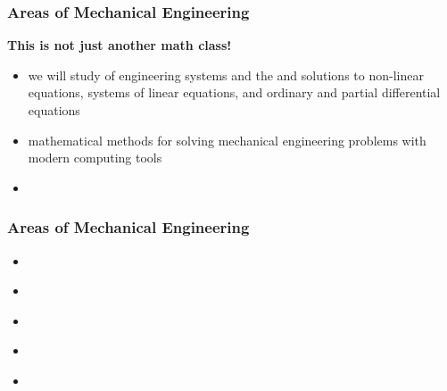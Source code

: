 \documentclass[fleqn]{beamer} %
\newcommand{\sectionIsubsectionIItitle}{Areas of Mechanical Engineering}
\begin{document}
			\begin{frame}
				\frametitle{\sectionIsubsectionIItitle}
				\bigskip

				\textbf{This is not just another math class!}\\

				\begin{itemize}
					\item we will study \underline{\hspace{40mm}} of engineering systems and the \underline{\hspace{30mm}} and \underline{\hspace{30mm}} solutions to non-linear equations, systems of linear equations, and ordinary and partial differential equations \\
					\item mathematical methods for solving mechanical engineering problems with modern computing tools\\
					\item \underline{\hspace{40mm}}
				\end{itemize}  

				\btVFill
			\end{frame}

			\begin{frame}
				\frametitle{\sectionIsubsectionIItitle}
				\bigskip

				\begin{itemize}
					\item \underline{\hspace{40mm}}\\
					\item \underline{\hspace{40mm}}\\
					\item \underline{\hspace{40mm}}\\
					\item \underline{\hspace{40mm}}\\
					\item \underline{\hspace{40mm}}\\
				\end{itemize}  

				\btVFill
			\end{frame}

\end{document}
